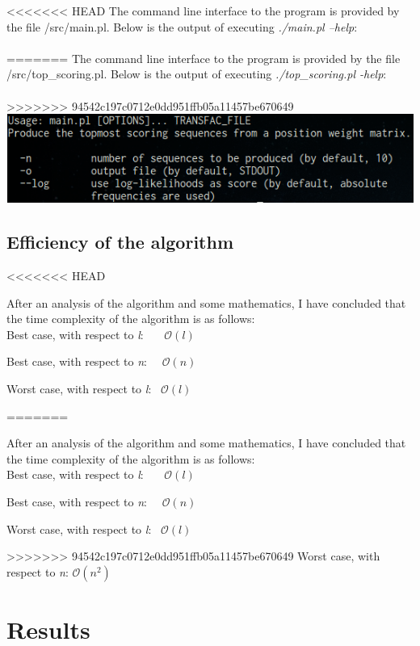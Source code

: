 \documentclass{article}
\begin{document}
<<<<<<< HEAD
The command line interface to the program is provided by the file /src/main.pl. Below is the output of executing \emph{./main.pl --help}:\\\\
=======
The command line interface to the program is provided by the file /src/top\_scoring.pl. Below is the output of executing \emph{./top\_scoring.pl \--help}:\\\\
>>>>>>> 94542c197c0712e0dd951ffb05a11457be670649
\includegraphics[scale=0.5]{perl}


\subsection{Efficiency of the algorithm} \label{efficiency}
<<<<<<< HEAD

After an analysis of the algorithm and some mathematics, I have concluded that the time complexity of the algorithm is as follows:\\

Best case, with respect to \emph{l}: \ \ \ $\mathcal{O}(l)$

Best case, with respect to \emph{n}: \ \ $\mathcal{O}(n)$

Worst case, with respect to \emph{l}: \ $\mathcal{O}(l)$

=======

After an analysis of the algorithm and some mathematics, I have concluded that the time complexity of the algorithm is as follows:\\

Best case, with respect to \emph{l}: \ \ \ $\mathcal{O}(l)$

Best case, with respect to \emph{n}: \ \ $\mathcal{O}(n)$

Worst case, with respect to \emph{l}: \ $\mathcal{O}(l)$

>>>>>>> 94542c197c0712e0dd951ffb05a11457be670649
Worst case, with respect to \emph{n}: $\mathcal{O}(n^2)$

\section{Results} \label{results}
\end{document}
